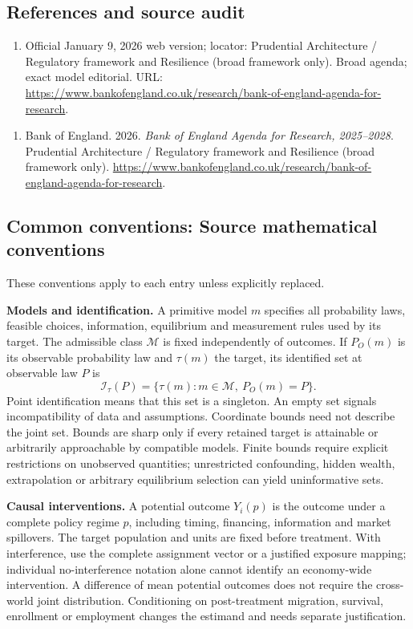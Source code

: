 \documentclass[11pt,a4paper]{article}
\begin{document}
\subsection*{References and source audit}
\begin{enumerate}
\item Official January 9, 2026 web version; locator: Prudential Architecture / Regulatory framework and Resilience (broad framework only). Broad agenda; exact model editorial. URL: \url{https://www.bankofengland.co.uk/research/bank-of-england-agenda-for-research}.
\end{enumerate}
\begin{enumerate}\raggedright
\item\hypertarget{definitions:source:30007603:1}{} Bank of England. 2026. \emph{Bank of England Agenda for Research, 2025–2028}. Prudential Architecture / Regulatory framework and Resilience (broad framework only).
\url{https://www.bankofengland.co.uk/research/bank-of-england-agenda-for-research}.
\end{enumerate}

\subsection*{Common conventions: Source mathematical conventions}

These conventions apply to each entry unless explicitly replaced.

\textbf{Models and identification.} A primitive model \(m\) specifies all probability laws, feasible choices, information, equilibrium and measurement rules used by its target. The admissible class \(\mathcal M\) is fixed independently of outcomes. If \(P_O(m)\) is its observable probability law and \(\tau(m)\) the target, its identified set at observable law \(P\) is
\[
 \mathcal I_\tau(P)=\{\tau(m):m\in\mathcal M,\ P_O(m)=P\}.
\]
Point identification means that this set is a singleton. An empty set signals incompatibility of data and assumptions. Coordinate bounds need not describe the joint set. Bounds are sharp only if every retained target is attainable or arbitrarily approachable by compatible models. Finite bounds require explicit restrictions on unobserved quantities; unrestricted confounding, hidden wealth, extrapolation or arbitrary equilibrium selection can yield uninformative sets.

\textbf{Causal interventions.} A potential outcome \(Y_i(p)\) is the outcome under a complete policy regime \(p\), including timing, financing, information and market spillovers. The target population and units are fixed before treatment. With interference, use the complete assignment vector or a justified exposure mapping; individual no-interference notation alone cannot identify an economy-wide intervention. A difference of mean potential outcomes does not require the cross-world joint distribution. Conditioning on post-treatment migration, survival, enrollment or employment changes the estimand and needs separate justification.
\end{document}
